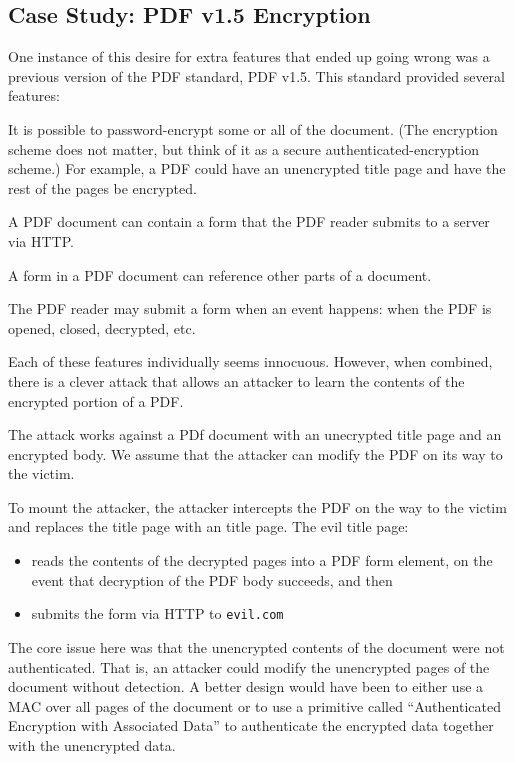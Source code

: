 \subsection{Case Study: PDF v1.5 Encryption}
One instance of this desire for extra features
that ended up going wrong was a previous version
of the PDF standard, PDF v1.5.\cite{muller2019practical}
This standard provided several features:
\begin{compactenum}
	\item It is possible to password-encrypt some or all of the document.
        (The encryption scheme does not matter, but think of it as
        a secure authenticated-encryption scheme.)
        For example, a PDF could have an unencrypted title page 
        and have the rest of the pages be encrypted.
	\item A PDF document can contain a form that the PDF reader
        submits to a server via HTTP.
	\item A form in a PDF document can reference other parts of a document.
	\item The PDF reader may submit a form when an event happens:
        when the PDF is opened, closed, decrypted, etc.
\end{compactenum}

Each of these features individually seems innocuous.
However, when combined, there is a clever attack that allows an attacker to 
learn the contents of the encrypted portion of a PDF.

The attack works against a PDf document with an unecrypted title page
and an encrypted body.
We assume that the attacker can modify the PDF on its way to the victim.

To mount the attacker, the attacker intercepts the
PDF on the way to the victim and replaces the
title page with an  title page.
The evil title page:
\begin{itemize}[noitemsep]
    \item reads the contents of the decrypted pages into a PDF form element,
          on the event that decryption of the PDF body succeeds, 
          and then
    \item submits the form via HTTP to \texttt{evil.com}
\end{itemize}

The core issue here was that the unencrypted
contents of the document were not authenticated.
That is, an attacker could modify the
unencrypted pages of the document without detection.
A better design would have been to either use
a MAC over all pages of the document or to use
a primitive called ``Authenticated Encryption with
Associated Data'' to authenticate the encrypted data
together with the unencrypted data.

